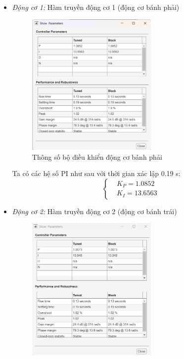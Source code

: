           \begin{itemize}
               \item \textit{Động cơ 1:} Hàm truyền động cơ 1 (động cơ bánh phải)
               \begin{figure}[H]
                    \centering
                    \includegraphics[width=0.6\textwidth]{pictures/chapter6/params_JGB1.png}
                    \caption{Thông số bộ điều khiển động cơ bánh phải}
                    \label{params_JGB1}
               \end{figure}
               \hspace*{0.6cm}Ta có các hệ số PI như sau với thời gian xác lập 0.19 s:
               \begin{equation*}
                    \begin{cases}
                         &K_P = 1.0852 \\ 
                         &K_I = 13.6563
                    \end{cases}
               \end{equation*} 
               \item \textit{Động cơ 2:} Hàm truyền động cơ 2 (động cơ bánh trái)\\
               \begin{figure}[H]
                    \centering
                    \includegraphics[width=0.6\textwidth]{pictures/chapter6/params_JGB2.png}

\end{figure}
\end{itemize}
